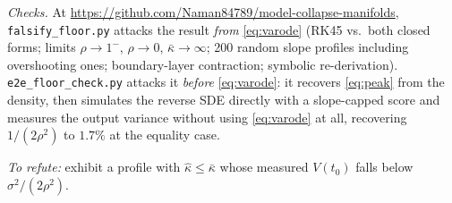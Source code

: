 \documentclass[10pt]{article}
\newcommand{\kb}{\bar\kappa}
\newcommand{\sigsq}{\sigma^2}
\begin{document}
\emph{Checks.} At \url{https://github.com/Naman84789/model-collapse-manifolds},
\texttt{falsify\_floor.py} attacks the result \emph{from} \eqref{eq:varode} (RK45 vs.\ both closed
forms; limits $\rho\to1^-$, $\rho\to0$, $\kb\to\infty$; 200 random slope profiles including
overshooting ones; boundary-layer contraction; symbolic re-derivation).
\texttt{e2e\_floor\_check.py} attacks it \emph{before} \eqref{eq:varode}: it recovers
\eqref{eq:peak} from the density, then simulates the reverse SDE directly with a slope-capped
score and measures the output variance without using \eqref{eq:varode} at all, recovering
$1/(2\rho^2)$ to $1.7\%$ at the equality case.

\emph{To refute:} exhibit a profile with $\hat\kappa\le\kb$ whose measured $V(t_0)$ falls below
$\sigsq/(2\rho^2)$.
\end{document}
